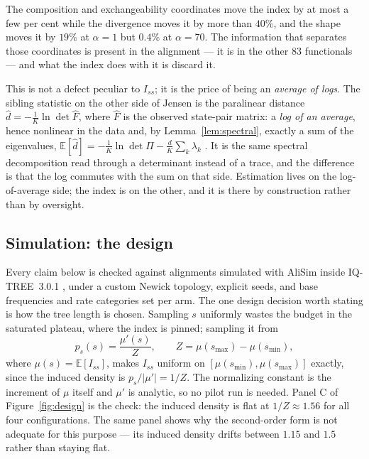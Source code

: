\documentclass[preprint,12pt,authoryear]{elsarticle}
\newcommand{\Iss}{I_{ss}}
\newcommand{\E}{\mathbb{E}}
\theoremstyle{definition}
\theoremstyle{remark}
\begin{document}
The composition and exchangeability coordinates move the index by at most a
few per cent while the divergence moves it by more than $40\%$, and the shape
moves it by $19\%$ at $\alpha=1$ but $0.4\%$ at $\alpha=70$. The information
that separates those coordinates is present in the alignment --- it is in the
other $83$ functionals --- and what the index does with it is discard it.

This is not a defect peculiar to $\Iss$; it is the price of being an
\emph{average of logs}. The sibling statistic on the other side of Jensen is
the paralinear distance $\hat d=-\frac1K\ln\det\hat F$, where $\hat F$ is the
observed state-pair matrix: a \emph{log of an average}, hence nonlinear in
the data and, by Lemma~\ref{lem:spectral}, exactly a sum of the eigenvalues,
$\E[\hat d]=-\frac1K\ln\det\Pi-\frac{d}{K}\sum_k\lambda_k$
\citep{lockhart1994recovering}. It is the same spectral decomposition read
through a determinant instead of a trace, and the difference is that the log
commutes with the sum on that side. Estimation lives on the log-of-average
side; the index is on the other, and it is there by construction rather than
by oversight.

\subsection{Simulation: the design}
\label{sec:design}

Every claim below is checked against alignments simulated with AliSim
\citep{lytrong2022alisim} inside IQ-TREE~3.0.1 \citep{minh2020iqtree2}, under
a custom Newick topology, explicit seeds, and base frequencies and rate
categories set per arm. The one design decision worth
stating is how the tree length is chosen. Sampling $s$ uniformly wastes the
budget in the saturated plateau, where the index is pinned; sampling it from
\begin{equation}
  p_s(s)=\frac{\mu'(s)}{Z},\qquad Z=\mu(s_{\max})-\mu(s_{\min}),
  \label{eq:design}
\end{equation}
where $\mu(s)=\E[\Iss]$, makes $\Iss$ uniform on
$[\mu(s_{\min}),\mu(s_{\max})]$ exactly, since the induced density is
$p_s/\lvert\mu'\rvert=1/Z$. The normalizing constant is the increment of
$\mu$ itself and $\mu'$ is analytic, so no pilot run is needed. Panel C of
Figure~\ref{fig:design} is the check: the induced density is flat at
$1/Z\approx1.56$ for all four configurations. The same panel shows why the
second-order form is not adequate for this purpose --- its induced density
drifts between $1.15$ and $1.5$ rather than staying flat.
\end{document}
